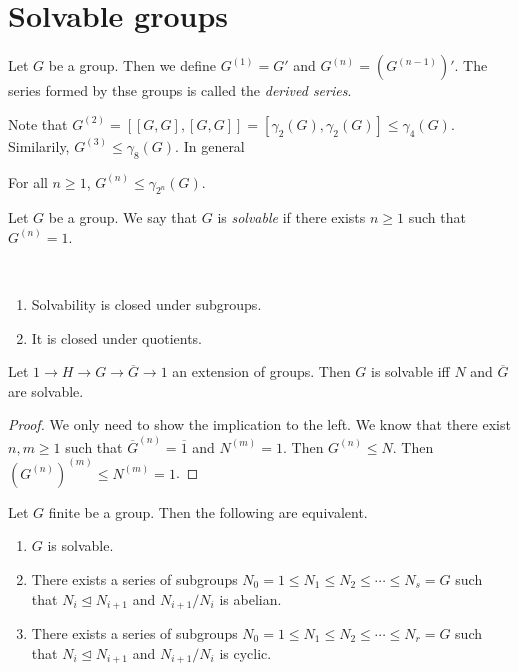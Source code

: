 \documentclass[twoside, 11pt]{article}
\begin{document}
\section{Solvable groups}

\begin{defi}
Let $G$ be a group. Then we define $G^{(1)}=G'$ and $G^{(n)}=(G^{(n-1)})'$. The series formed by thse groups is called the \emph{derived series}.
\end{defi}

Note that $G^{(2)}=[[G,G],[G,G]]=[\gamma_2(G),\gamma_2(G)]\leq \gamma_4(G)$. Similarily, $G^{(3)}\leq \gamma_8(G)$. In general

\begin{lemma}
For all $n\geq 1$, $G^{(n)}\leq \gamma_{2^n}(G)$.
\end{lemma}

\begin{defi}
Let $G$ be a group. We say that $G$ is \emph{solvable} if there exists $n\geq 1$ such that $G^{(n)}=1$.
\end{defi}

\begin{prop}\
\begin{enumerate}
\item Solvability is closed under subgroups.
\item It is closed under quotients. 
\end{enumerate}
\end{prop}


\begin{lemma}
Let $1\to H\to G\to \overline{G}\to 1$ an extension of groups. Then $G$ is solvable iff $N$ and $\overline{G}$ are solvable.
\end{lemma}
\begin{proof}
We only need to show the implication to the left. We know that there exist $n,m\geq 1$ such that $\overline{G}^{(n)}=\overline{1}$ and $N^{(m)}=1$. Then $G^{(n)}\leq N$. Then $(G^{(n)})^{(m)}\leq N^{(m)}=1$.
\end{proof}

\begin{prop}
Let $G$ finite be a group. Then the following are equivalent.
\begin{enumerate}
\item $G$ is solvable.
\item There exists a series of subgroups $N_0=1\leq N_1\leq N_2\leq\cdots\leq N_s=G$ such that $N_i\trianglelefteq N_{i+1}$ and $N_{i+1}/N_i$ is abelian.
\item There exists a series of subgroups $N_0=1\leq N_1\leq N_2\leq\cdots\leq N_r=G$ such that $N_i\trianglelefteq N_{i+1}$ and $N_{i+1}/N_i$ is cyclic. 
\end{enumerate}
\end{prop}
\end{document}
